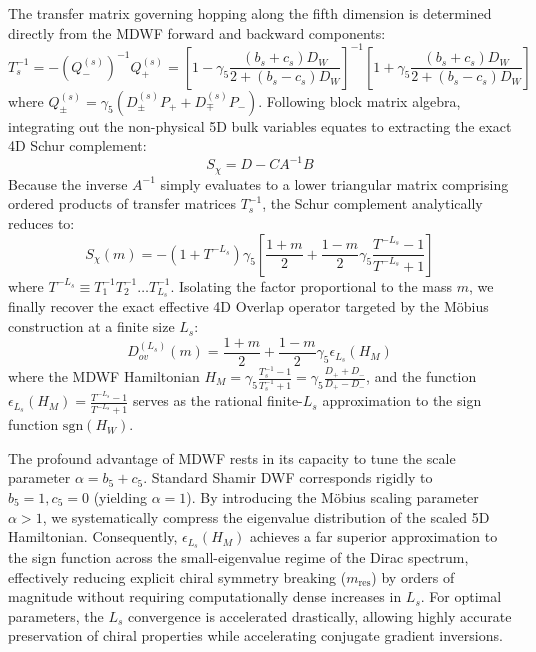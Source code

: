 The transfer matrix governing hopping along the fifth dimension is determined directly from the MDWF forward and backward components:
\begin{equation}
T_s^{-1} = -\left(Q_-^{(s)}\right)^{-1} Q_+^{(s)} = \left[ 1 - \gamma_5 \frac{(b_s + c_s)D_W}{2 + (b_s - c_s)D_W} \right]^{-1} \left[ 1 + \gamma_5 \frac{(b_s + c_s)D_W}{2 + (b_s - c_s)D_W} \right]
\end{equation}
where $Q_{\pm}^{(s)} = \gamma_5 \left(D_{\pm}^{(s)}P_+ + D_{\mp}^{(s)}P_-\right)$. Following block matrix algebra, integrating out the non-physical 5D bulk variables equates to extracting the exact 4D Schur complement:
\begin{equation}
S_\chi = D - C A^{-1} B
\end{equation}
Because the inverse $A^{-1}$ simply evaluates to a lower triangular matrix comprising ordered products of transfer matrices $T_s^{-1}$, the Schur complement analytically reduces to:
\begin{equation}
S_\chi(m) = -(1 + T^{-L_s})\gamma_5 \left[ \frac{1+m}{2} + \frac{1-m}{2} \gamma_5 \frac{T^{-L_s}-1}{T^{-L_s}+1} \right]
\end{equation}
where $T^{-L_s} \equiv T_1^{-1} T_2^{-1} \dots T_{L_s}^{-1}$.
Isolating the factor proportional to the mass $m$, we finally recover the exact effective 4D Overlap operator targeted by the M\"obius construction at a finite size $L_s$:
\begin{equation}
D_{ov}^{(L_s)}(m) = \frac{1+m}{2} + \frac{1-m}{2} \gamma_5 \epsilon_{L_s} (H_M)
\end{equation}
where the MDWF Hamiltonian $H_M = \gamma_5 \frac{T_s^{-1}-1}{T_s^{-1}+1} = \gamma_5 \frac{D_+ + D_-}{D_+ - D_-}$, and the function $\epsilon_{L_s}(H_M) = \frac{T^{-L_s}-1}{T^{-L_s}+1}$ serves as the rational finite-$L_s$ approximation to the sign function $\mathrm{sgn}(H_W)$.

The profound advantage of MDWF rests in its capacity to tune the scale parameter $\alpha = b_5 + c_5$. Standard Shamir DWF corresponds rigidly to $b_5 = 1, c_5 = 0$ (yielding $\alpha = 1$). By introducing the M\"obius scaling parameter $\alpha > 1$, we systematically compress the eigenvalue distribution of the scaled 5D Hamiltonian. Consequently, $\epsilon_{L_s}(H_M)$ achieves a far superior approximation to the sign function across the small-eigenvalue regime of the Dirac spectrum, effectively reducing explicit chiral symmetry breaking ($m_{\mathrm{res}}$) by orders of magnitude without requiring computationally dense increases in $L_s$. For optimal parameters, the $L_s$ convergence is accelerated drastically, allowing highly accurate preservation of chiral properties while accelerating conjugate gradient inversions.

